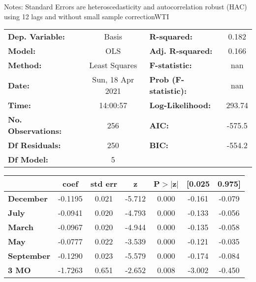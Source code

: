 Notes: \newline
 [1] Standard Errors are heteroscedasticity and autocorrelation robust (HAC) using 12 lags and without small sample correctionWTI\begin{center}
\begin{tabular}{lclc}
\toprule
\textbf{Dep. Variable:}    &      Basis       & \textbf{  R-squared:         } &     0.182   \\
\textbf{Model:}            &       OLS        & \textbf{  Adj. R-squared:    } &     0.166   \\
\textbf{Method:}           &  Least Squares   & \textbf{  F-statistic:       } &       nan   \\
\textbf{Date:}             & Sun, 18 Apr 2021 & \textbf{  Prob (F-statistic):} &      nan    \\
\textbf{Time:}             &     14:00:57     & \textbf{  Log-Likelihood:    } &    293.74   \\
\textbf{No. Observations:} &         256      & \textbf{  AIC:               } &    -575.5   \\
\textbf{Df Residuals:}     &         250      & \textbf{  BIC:               } &    -554.2   \\
\textbf{Df Model:}         &           5      & \textbf{                     } &             \\
\bottomrule
\end{tabular}
\begin{tabular}{lcccccc}
                   & \textbf{coef} & \textbf{std err} & \textbf{z} & \textbf{P$> |$z$|$} & \textbf{[0.025} & \textbf{0.975]}  \\
\midrule
\textbf{December}  &      -0.1195  &        0.021     &    -5.712  &         0.000        &       -0.161    &       -0.079     \\
\textbf{July}      &      -0.0941  &        0.020     &    -4.793  &         0.000        &       -0.133    &       -0.056     \\
\textbf{March}     &      -0.0967  &        0.020     &    -4.944  &         0.000        &       -0.135    &       -0.058     \\
\textbf{May}       &      -0.0777  &        0.022     &    -3.539  &         0.000        &       -0.121    &       -0.035     \\
\textbf{September} &      -0.1290  &        0.023     &    -5.579  &         0.000        &       -0.174    &       -0.084     \\
\textbf{3 MO}      &      -1.7263  &        0.651     &    -2.652  &         0.008        &       -3.002    &       -0.450     \\

\end{tabular}
\end{center}

